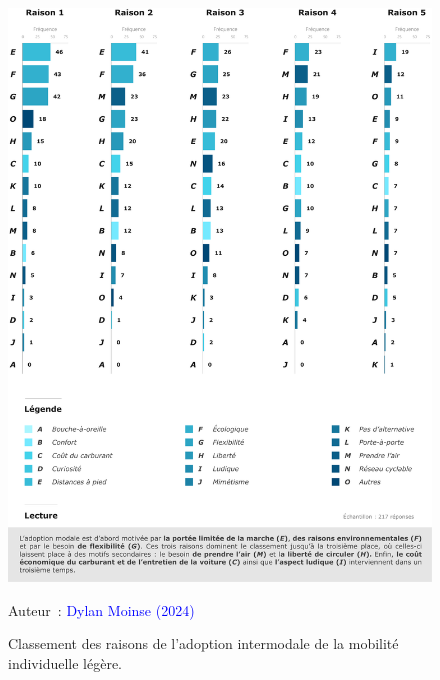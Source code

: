 \begin{refsegment}
    \begin{figure}[h!]\vspace*{4pt}
        \caption{Classement des raisons de l'adoption intermodale de la mobilité individuelle légère.}
        \label{fig-chap4:classement-global-raisons}
        \centerline{\includegraphics[width=1\columnwidth]{src/Figures/Chap-4/FR_Raisons_adoption.pdf}}
        \vspace{5pt}
        \begin{flushright}\scriptsize{
        Auteur~: \textcolor{blue}{Dylan Moinse (2024)}
        }\end{flushright}
    \end{figure}


\end{refsegment}
